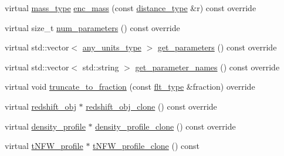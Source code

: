 \begin{DoxyCompactItemize}
\item 
virtual \hyperlink{namespaceIceBRG_a1be72ac4918a9b029f2eefa084213e35}{mass\+\_\+type} \hyperlink{classIceBRG_1_1tNFW__profile_a13939b7320cf1fd3be20343212d0e663}{enc\+\_\+mass} (const \hyperlink{namespaceIceBRG_a45499647eb87e24c10ab32c628711cec}{distance\+\_\+type} \&r) const  override
\item 
virtual size\+\_\+t \hyperlink{classIceBRG_1_1tNFW__profile_a3317838b91dfafb06fc61343ad63b365}{num\+\_\+parameters} () const  override
\item 
virtual std\+::vector$<$ \hyperlink{namespaceIceBRG_a3101fc159e191fa99c4ec14e445df96e}{any\+\_\+units\+\_\+type} $>$ \hyperlink{classIceBRG_1_1tNFW__profile_ab659523c00e3fabc0350b8d9a423aefd}{get\+\_\+parameters} () const  override
\item 
virtual std\+::vector$<$ std\+::string $>$ \hyperlink{classIceBRG_1_1tNFW__profile_a89938a2cecd5905c558e35fd295335cd}{get\+\_\+parameter\+\_\+names} () const  override
\item 
virtual void \hyperlink{classIceBRG_1_1tNFW__profile_a163f67ff1329a1a251d7fb8c99a32d17}{truncate\+\_\+to\+\_\+fraction} (const \hyperlink{lib_2IceBRG__main_2common_8h_ad0f130a56eeb944d9ef2692ee881ecc4}{flt\+\_\+type} \&fraction) override
\item 
virtual \hyperlink{classIceBRG_1_1redshift__obj}{redshift\+\_\+obj} $\ast$ \hyperlink{classIceBRG_1_1tNFW__profile_ad7e0649c9782b10fc05cd7a24d43d325}{redshift\+\_\+obj\+\_\+clone} () const  override
\item 
virtual \hyperlink{classIceBRG_1_1density__profile}{density\+\_\+profile} $\ast$ \hyperlink{classIceBRG_1_1tNFW__profile_abf08721d23c2f612f92c1e97e6bf6453}{density\+\_\+profile\+\_\+clone} () const  override
\item 
virtual \hyperlink{classIceBRG_1_1tNFW__profile}{t\+N\+F\+W\+\_\+profile} $\ast$ \hyperlink{classIceBRG_1_1tNFW__profile_a7b652f93aa159c0bdffa657f4bfa1c46}{t\+N\+F\+W\+\_\+profile\+\_\+clone} () const 
\end{DoxyCompactItemize}
